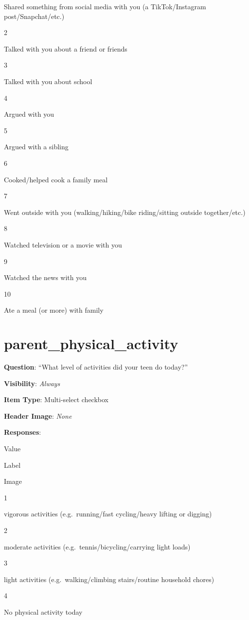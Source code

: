 \documentclass[]{book}
\begin{document}
Shared something from social media with you (a TikTok/Instagram post/Snapchat/etc.)

2

Talked with you about a friend or friends

3

Talked with you about school

4

Argued with you

5

Argued with a sibling

6

Cooked/helped cook a family meal

7

Went outside with you (walking/hiking/bike riding/sitting outside together/etc.)

8

Watched television or a movie with you

9

Watched the news with you

10

Ate a meal (or more) with family

\hypertarget{parent_physical_activity}{%
\section{parent\_physical\_activity}\label{parent_physical_activity}}

\textbf{Question}: ``What level of activities did your teen do today?''

\textbf{Visibility}: \emph{Always}

\textbf{Item Type}: Multi-select checkbox

\textbf{Header Image}: \emph{None}

\textbf{Responses}:

Value

Label

Image

1

vigorous activities (e.g.~running/fast cycling/heavy lifting or digging)

2

moderate activities (e.g.~tennis/bicycling/carrying light loads)

3

light activities (e.g.~walking/climbing stairs/routine household chores)

4

No physical activity today
\end{document}
